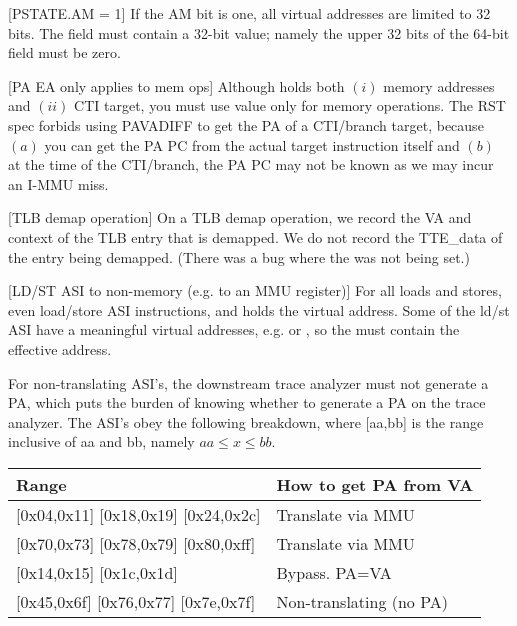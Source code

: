 \documentclass[10pt]{article}
\begin{document}
\begin{rqitemize}{0em}
  \item {} [PSTATE.AM = 1] If the AM bit is one, all virtual addresses
are limited to 32 bits.  The  field must
contain a 32-bit value; namely the upper 32 bits of the 64-bit
 field must be zero.

  \item {}[PA EA only applies to mem ops]
Although  holds both $(i)$ memory addresses and
$(ii)$ CTI target, you must use  value
only for memory operations.  The RST spec forbids using PAVADIFF to get
the PA of a CTI/branch target, because $(a)$ you can get the PA PC from
the actual target instruction itself and $(b)$ at the time of the
CTI/branch, the PA PC may not be known as we may incur an I-MMU miss.

  \item {}[TLB demap operation] On a TLB demap operation, we record the
  VA and context of the TLB entry that is demapped.  We do not record
  the TTE\_data of the entry being demapped.  (There was a bug where the
   was not being set.)

  \item {}[LD/ST ASI to non-memory (e.g. to an MMU register)] For all
loads and stores, even load/store ASI instructions,
 and  holds
the virtual address.  Some of the ld/st ASI have a meaningful virtual
addresses, e.g.  or
, so the 
must contain the effective address.

For non-translating ASI's, the downstream trace analyzer must not
generate a PA, which puts the burden of knowing whether to generate a PA
on the trace analyzer.  The ASI's obey the following breakdown, where
[aa,bb] is the range inclusive of aa and bb, namely $aa \le x \le bb$.

\begin{tabular}{|l|l|} \hline
  Range & How to get PA from VA \\ \hline
  {}[0x04,0x11] [0x18,0x19] [0x24,0x2c] & Translate via MMU \\
  {}[0x70,0x73] [0x78,0x79] [0x80,0xff] & Translate via MMU \\ \hline
  {}[0x14,0x15] [0x1c,0x1d] & Bypass.  PA=VA \\ \hline
  {}[0x45,0x6f] [0x76,0x77] [0x7e,0x7f] & Non-translating (no PA) \\ \hline
\end{tabular}


\end{rqitemize}
\end{document}
